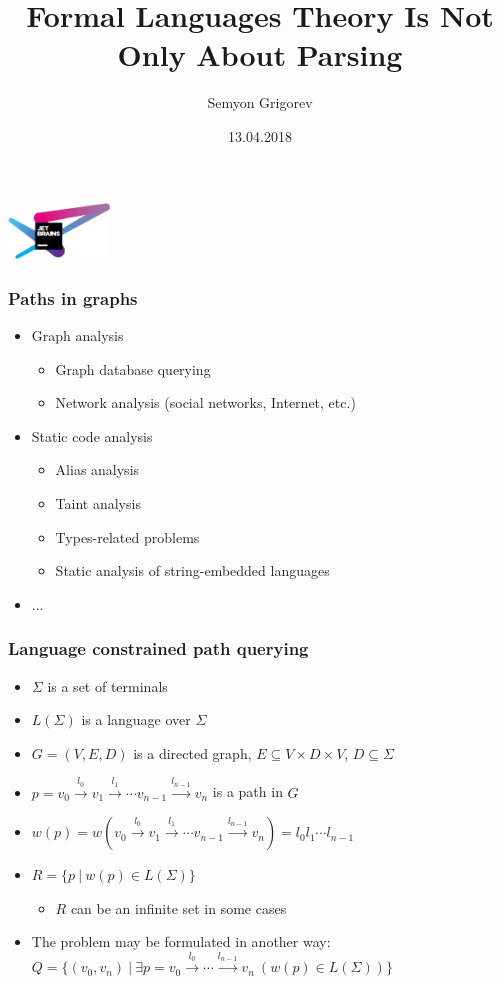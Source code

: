 \documentclass[xcolor=table,aspectratio=169]{beamer}
\title[CFPQ]{Formal Languages Theory Is Not Only About Parsing}
\institute[JetBrains Research]{
JetBrains Research, Programming Languages and Tools Lab
}
\author[Semyon Grigorev]{Semyon Grigorev}
\date{13.04.2018}
\begin{document}
{
\begin{frame}[fragile]
   \begin{center}
      \includegraphics[height=1.5cm]{pictures/JBLogo3.pdf}
    \end{center}
  \titlepage
\end{frame}
}

\begin{frame}[fragile]
  \transwipe[direction=90]
  \frametitle{Paths in graphs}
  \begin{itemize}
  \item Graph analysis
    \begin{itemize}
        \item Graph database querying
        \item Network analysis (social networks, Internet, etc.)
    \end{itemize}
  \item Static code analysis
      \begin{itemize}
        \item Alias analysis
        \item Taint analysis
        \item Types-related problems
        \item Static analysis of string-embedded languages
      \end{itemize}
   \item ...
  \end{itemize}
\end{frame}

\begin{frame}[fragile]
  \transwipe[direction=90]
  \frametitle{Language constrained path querying}
  \begin{itemize}
  \item $\Sigma$ is a set of terminals 
  \item $L(\Sigma)$ is a language over $\Sigma$
  \pause
  \item $G = (V,E,D)$ is a directed graph, $E \subseteq V\times D \times V$, $D\subseteq \Sigma$
  \pause
  \item $p = v_0 \xrightarrow{l_0} v_1 \xrightarrow{l_1} \cdots v_{n-1}\xrightarrow{l_{n-1}}v_n$ is a path in $G$
  \item $w(p) = w(v_0 \xrightarrow{l_0} v_1 \xrightarrow{l_1} \cdots v_{n-1}\xrightarrow{l_{n-1}}v_n) = l_0 l_1 \cdots l_{n-1}$
  \pause
  \item $R =\{ p \ | \ w(p) \in L(\Sigma)\}$
  \begin{itemize}
    \item $R$ can be an infinite set in some cases
  \end{itemize}
  \pause
  \item The problem may be formulated in another way: $Q =\{ (v_0,v_n) \ | \ \exists p = v_0 \xrightarrow{l_0} \cdots \xrightarrow{l_{n-1}}v_n \ (w(p) \in 
  L(\Sigma))\}$
  \end{itemize}
\end{frame}
\end{document}

